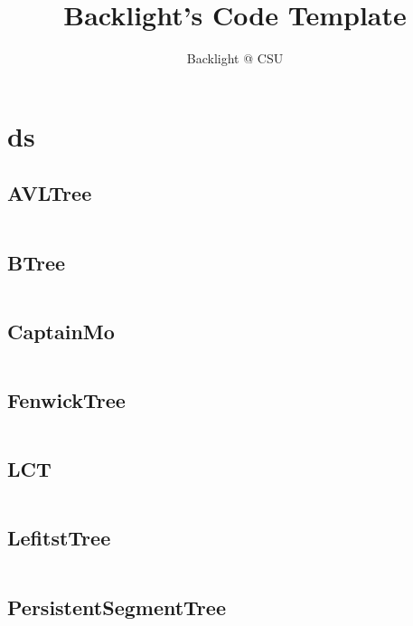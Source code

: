 \documentclass[a4]{article}
\title{\CJKfamily{hei} \bfseries Backlight's Code Template}
\author{Backlight @ CSU}
\begin{document}
\small
\begin{titlepage}
  \maketitle
\end{titlepage}

\newpage
\pagestyle{empty}
\renewcommand{\contentsname}{目录}
\tableofcontents
\newpage\clearpage
\newpage
\pagestyle{fancy}
\setcounter{page}{1}   %


\section{ds}
\subsection{AVLTree}
\inputminted[mathescape,linenos,numbersep=5pt,frame=lines,framesep=2mm]{cpp}{src/ds/AVLTree.cpp}
\subsection{BTree}
\inputminted[mathescape,linenos,numbersep=5pt,frame=lines,framesep=2mm]{cpp}{src/ds/BTree.cpp}
\subsection{CaptainMo}
\inputminted[mathescape,linenos,numbersep=5pt,frame=lines,framesep=2mm]{cpp}{src/ds/CaptainMo.cpp}
\subsection{FenwickTree}
\inputminted[mathescape,linenos,numbersep=5pt,frame=lines,framesep=2mm]{cpp}{src/ds/FenwickTree.cpp}
\subsection{LCT}
\inputminted[mathescape,linenos,numbersep=5pt,frame=lines,framesep=2mm]{cpp}{src/ds/LCT.cpp}
\subsection{LefitstTree}
\inputminted[mathescape,linenos,numbersep=5pt,frame=lines,framesep=2mm]{cpp}{src/ds/LefitstTree.cpp}
\subsection{PersistentSegmentTree}
\inputminted[mathescape,linenos,numbersep=5pt,frame=lines,framesep=2mm]{cpp}{src/ds/PersistentSegmentTree.cpp}
\end{document}
